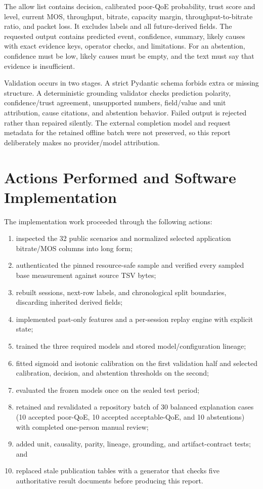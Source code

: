 \documentclass[10pt,conference]{IEEEtran}
\begin{document}
The allow list contains decision, calibrated poor-QoE probability, trust score
and level, current MOS, throughput, bitrate, capacity margin,
throughput-to-bitrate ratio, and packet loss.  It excludes labels and all
future-derived fields.  The requested output contains predicted event,
confidence, summary, likely causes with exact evidence keys, operator checks,
and limitations.  For an abstention, confidence must be low, likely causes
must be empty, and the text must say that evidence is insufficient.

Validation occurs in two stages.  A strict Pydantic schema forbids extra or
missing structure.  A deterministic grounding validator checks prediction
polarity, confidence/trust agreement, unsupported numbers, field/value and
unit attribution, cause citations, and abstention behavior.  Failed output is
rejected rather than repaired silently.  The external completion model and
request metadata for the retained offline batch were not preserved, so this
report deliberately makes no provider/model attribution.

\section{Actions Performed and Software Implementation}

The implementation work proceeded through the following actions:

\begin{enumerate}
\item inspected the 32 public scenarios and normalized selected application
      bitrate/MOS columns into long form;
\item authenticated the pinned resource-safe sample and verified every sampled
      base measurement against source TSV bytes;
\item rebuilt sessions, next-row labels, and chronological split boundaries,
      discarding inherited derived fields;
\item implemented past-only features and a per-session replay engine with
      explicit state;
\item trained the three required models and stored model/configuration lineage;
\item fitted sigmoid and isotonic calibration on the first validation half and
      selected calibration, decision, and abstention thresholds on the second;
\item evaluated the frozen models once on the sealed test period;
\item retained and revalidated a repository batch of 30 balanced explanation
      cases (10 accepted poor-QoE, 10 accepted acceptable-QoE, and 10
      abstentions) with completed one-person manual review;
\item added unit, causality, parity, lineage, grounding, and artifact-contract
      tests; and
\item replaced stale publication tables with a generator that checks five
      authoritative result documents before producing this report.
\end{enumerate}
\end{document}
